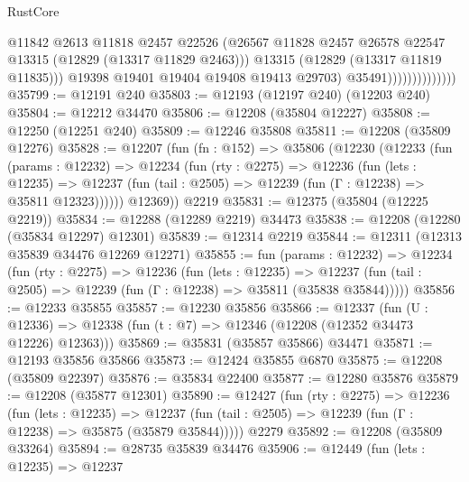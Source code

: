 \begin{lexlean}{RustCore}
\begin{coremodule}
                                    @11842
                                    @2613
                                    @11818
                                    @2457
                                    @22526
                                    (@26567
                                      @11828
                                      @2457
                                      @26578
                                      @22547
                                      @13315
                                      (@12829 (@13317 @11829 @2463)))
                                    @13315
                                    (@12829 (@13317 @11819 @11835)))
                                  @19398
                                  @19401
                                  @19404
                                  @19408
                                  @19413
                                  @29703)
                                @35491))))))))))))))
@35799 := @12191 @240
@35803 := @12193 (@12197 @240) (@12203 @240)
@35804 := @12212 @34470
@35806 := @12208 (@35804 @12227)
@35808 := @12250 (@12251 @240)
@35809 := @12246 @35808
@35811 := @12208 (@35809 @12276)
@35828 := @12207
    (fun (fn : @152) =>
    @35806
      (@12230
        (@12233
          (fun (params : @12232) =>
          @12234
            (fun (rty : @2275) =>
            @12236
              (fun (lets : @12235) =>
              @12237 (fun (tail : @2505) => @12239 (fun (Γ : @12238) => @35811 @12323))))))
        @12369))
    @2219
@35831 := @12375 (@35804 (@12225 @2219))
@35834 := @12288 (@12289 @2219) @34473
@35838 := @12208 (@12280 (@35834 @12297) @12301)
@35839 := @12314 @2219
@35844 := @12311 (@12313 @35839 @34476 @12269 @12271)
@35855 := fun (params : @12232) =>
  @12234
    (fun (rty : @2275) =>
    @12236
      (fun (lets : @12235) =>
      @12237 (fun (tail : @2505) => @12239 (fun (Γ : @12238) => @35811 (@35838 @35844)))))
@35856 := @12233 @35855
@35857 := @12230 @35856
@35866 := @12337
    (fun (U : @12336) => @12338 (fun (t : @7) => @12346 (@12208 (@12352 @34473 @12226) @12363)))
@35869 := @35831 (@35857 @35866) @34471
@35871 := @12193 @35856 @35866
@35873 := @12424 @35855 @6870
@35875 := @12208 (@35809 @22397)
@35876 := @35834 @22400
@35877 := @12280 @35876
@35879 := @12208 (@35877 @12301)
@35890 := @12427
    (fun (rty : @2275) =>
    @12236
      (fun (lets : @12235) =>
      @12237 (fun (tail : @2505) => @12239 (fun (Γ : @12238) => @35875 (@35879 @35844)))))
    @2279
@35892 := @12208 (@35809 @33264)
@35894 := @28735 @35839 @34476
@35906 := @12449
    (fun (lets : @12235) =>
    @12237

\end{coremodule}
\end{lexlean}
